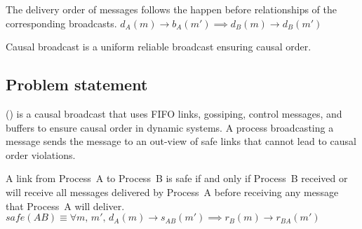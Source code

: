

\begin{definition}
  The delivery order of messages follows the happen before relationships of the
  corresponding broadcasts.
  $d_A(m) \rightarrow b_A(m') \implies d_B(m) \rightarrow d_B(m')$
\end{definition}

\begin{definition}
  Causal broadcast is a uniform reliable broadcast ensuring causal order.
\end{definition}



%     

\subsection{Problem statement}
\label{subsec:problemstatement}

\PCBROADCAST (\REF) is a causal broadcast that uses FIFO links, gossiping,
control messages, and buffers to ensure causal order in dynamic systems. A
process broadcasting a message sends the message to an out-view of safe links
that cannot lead to causal order violations.

\begin{definition}  
  A link from Process~A to Process~B is safe if and only if Process~B received
  or will receive all messages delivered by Process~A before receiving any
  message that Process~A will
  deliver. $safe(AB) \equiv \forall m,\, m',\, d_A(m) \rightarrow s_{AB}(m')
  \implies r_B(m) \rightarrow r_{BA}(m')$
\end{definition}


